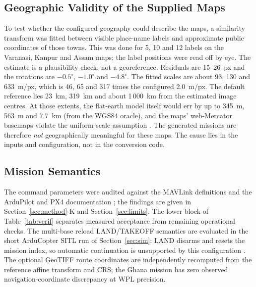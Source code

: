 \subsection{Geographic Validity of the Supplied Maps}
\label{sec:geovalid}
To test whether the configured geography could describe the maps, a similarity transform was fitted between visible place-name labels and approximate public coordinates of those towns. This was done for 5, 10 and 12 labels on the Varanasi, Kanpur and Assam maps; the label positions were read off by eye. The estimate is a plausibility check, not a georeference. Residuals are 15--26~px and the rotations are $-0.5^\circ$, $-1.0^\circ$ and $-4.8^\circ$. The fitted scales are about 93, 130 and 633~m/px, which is 46, 65 and 317 times the configured 2.0~m/px. The default reference lies 23~km, 319~km and about 1\,000~km from the estimated image centres. At those extents, the flat-earth model itself would err by up to 345~m, 563~m and 7.7~km (from the WGS84 oracle), and the maps' web-Mercator basemaps violate the uniform-scale assumption \cite{battersby2014implications}. The generated missions are therefore \emph{not} geographically meaningful for these maps. The cause lies in the inputs and configuration, not in the conversion code.

\subsection{Mission Semantics}
The command parameters were audited against the MAVLink definitions and the ArduPilot and PX4 documentation \cite{mavlink_common,mavlink_mission,ardupilot_missioncmds,px4_missions}; the findings are given in Section~\ref{sec:method}-K and Section~\ref{sec:limits}. The lower block of Table~\ref{tab:verif} separates measured acceptance from remaining operational checks. The multi-base reload LAND/TAKEOFF semantics are evaluated in the short ArduCopter SITL run of Section~\ref{sec:sim}: LAND disarms and resets the mission index, so automatic continuation is unsupported by this configuration \cite{ardupilot_continue}. The optional GeoTIFF route coordinates are independently recomputed from the reference affine transform and CRS; the Ghana mission has zero observed navigation-coordinate discrepancy at WPL precision.

